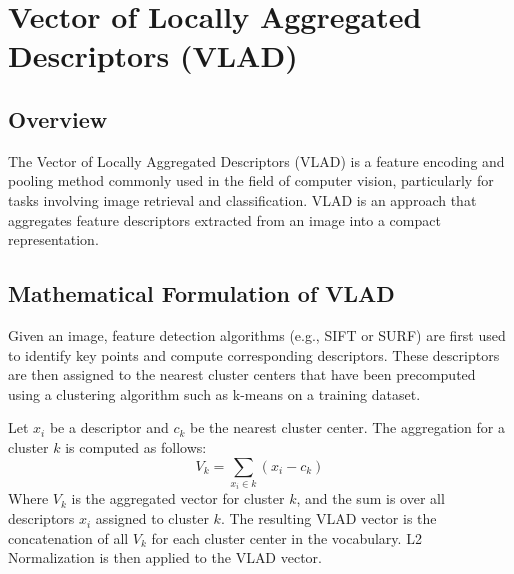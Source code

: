 

\section*{Vector of Locally Aggregated Descriptors (VLAD)}

\subsection*{Overview}
The Vector of Locally Aggregated Descriptors (VLAD) is a feature encoding and pooling method commonly used in the field of computer vision, particularly for tasks involving image retrieval and classification. VLAD is an approach that aggregates feature descriptors extracted from an image into a compact representation.

\subsection*{Mathematical Formulation of VLAD}
Given an image, feature detection algorithms (e.g., SIFT or SURF) are first used to identify key points and compute corresponding descriptors. These descriptors are then assigned to the nearest cluster centers that have been precomputed using a clustering algorithm such as k-means on a training dataset.

Let $x_i$ be a descriptor and $c_k$ be the nearest cluster center. The aggregation for a cluster $k$ is computed as follows:
\begin{equation}
V_k = \sum_{x_i \in k} (x_i - c_k)
\end{equation}
Where $V_k$ is the aggregated vector for cluster $k$, and the sum is over all descriptors $x_i$ assigned to cluster $k$. The resulting VLAD vector is the concatenation of all $V_k$ for each cluster center in the vocabulary. L2 Normalization
is then applied to the VLAD vector.

